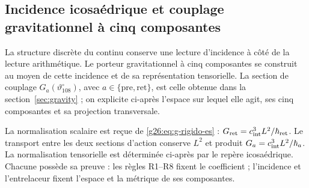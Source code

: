 \subsection{Incidence icosaédrique et couplage gravitationnel à cinq composantes}
\label{sec:ii-pentadica}

La structure discrète du continu conserve une lecture d’incidence
à côté de la lecture arithmétique. Le porteur gravitationnel à cinq composantes se
construit au moyen de cette incidence et de sa représentation tensorielle. La section
de couplage \(G_a(\vartheta^\circ_{108})\), avec
\(a\in\{\mathrm{pre},\mathrm{ret}\}\), est celle obtenue dans la
section~\ref{sec:gravity} ; on explicite ci-après l’espace sur
lequel elle agit, ses cinq composantes et sa projection transversale.

La normalisation scalaire est reçue de
\eqref{g26:eq:g-rigido-es} : \(G_{\rm ret}=c_{\rm int}^3L^2/\hbar_{\rm ret}\).
Le transport entre les deux sections d’action conserve \(L^2\) et
produit \(G_a=c_{\rm int}^3L^2/\hbar_a\). La normalisation tensorielle
est déterminée ci-après par le repère icosaédrique. Chacune possède
sa preuve : les règles R1--R8 fixent le coefficient ; l’incidence et
l’entrelaceur fixent l’espace et la métrique de ses composantes.

